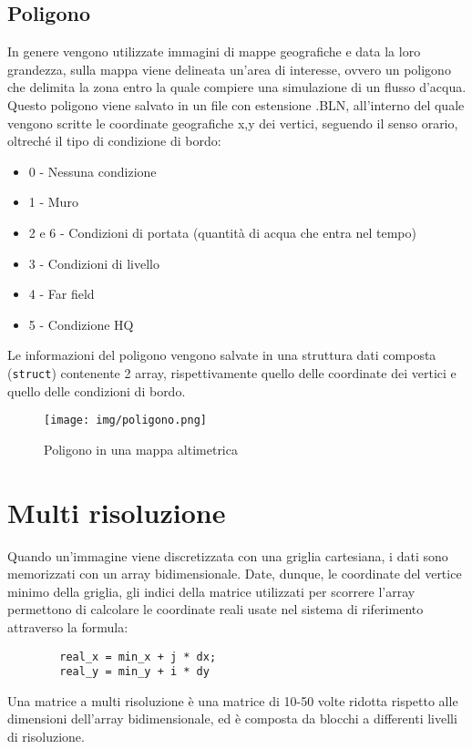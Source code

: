 	\subsection{Poligono}
		In genere vengono utilizzate immagini di mappe geografiche e data la loro grandezza, sulla mappa viene delineata un'area di interesse, ovvero un poligono che delimita la zona entro la quale compiere una simulazione di un flusso d'acqua. 
		Questo poligono viene salvato in un file con estensione .BLN, all'interno del quale vengono scritte le coordinate geografiche x,y dei vertici, seguendo il senso orario, oltrech\'{e} il tipo di condizione di bordo:
		\begin{itemize}
			\item 0 - Nessuna condizione
			\item 1 - Muro
			\item 2 e 6 - Condizioni di portata (quantit\`{a} di acqua che entra nel tempo)
			\item 3 - Condizioni di livello
			\item 4 - Far field
			\item 5 - Condizione HQ
		\end{itemize}
		Le informazioni del poligono vengono salvate in una struttura dati composta (\texttt{struct}) contenente 2 array, rispettivamente quello delle coordinate dei vertici e quello delle condizioni di bordo.
		\begin{figure}[htbp]
			\centering
			\texttt{[image: img/poligono.png]}
			\caption{Poligono in una mappa altimetrica}
		\end{figure}

\section{Multi risoluzione}
	Quando un'immagine viene discretizzata con una griglia cartesiana, i dati sono memorizzati con un array bidimensionale. Date, dunque, le coordinate del vertice minimo della griglia, gli indici della matrice utilizzati per scorrere l'array permettono di calcolare le coordinate reali usate nel sistema di riferimento attraverso la formula:
	\begin{verbatim}
		real_x = min_x + j * dx;
		real_y = min_y + i * dy
	\end{verbatim} 
	Una matrice a multi risoluzione \`{e} una matrice di 10-50 volte ridotta rispetto alle dimensioni dell'array bidimensionale, ed \`{e} composta da blocchi a differenti livelli di risoluzione.   
	 

